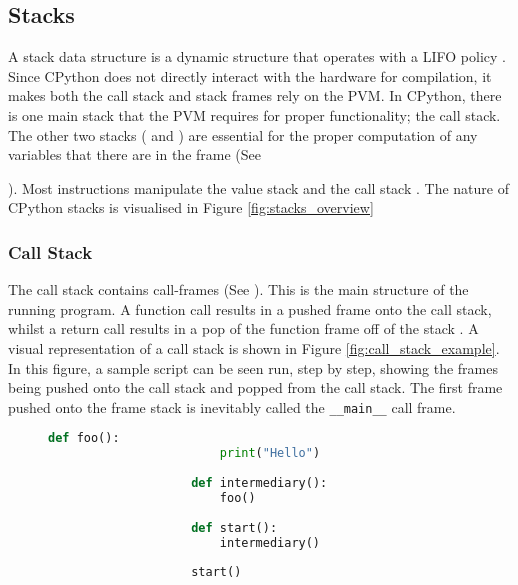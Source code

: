 		\subsection{Stacks}
		\label{subsec:stacks}
		\par A stack data structure is a dynamic structure that operates with a LIFO policy \cite[]{intro2009algorithms}. Since CPython does not directly interact with
		the hardware for compilation, it makes both the call stack and stack frames rely on the PVM. In CPython, there is one main stack that the PVM requires for proper functionality; the call stack. 
		The other two stacks ( and ) are essential for the proper computation of any variables that there are in the
		frame (See {{\bfseries{}}). Most instructions manipulate the value stack and the call stack \cite[]{general2018stacks}. The nature of CPython stacks is visualised in Figure \ref{fig:stacks_overview}
			\subsubsection*{Call Stack}
			\label{subsubsec:call_stack}
			\par The call stack contains call-frames (See {\bfseries{}}). This is the main structure of the running program.
			A function call results in a pushed frame onto the call stack, whilst 
			a return call results in a pop of the function frame off of the stack \cite[]{call2010stack}. A visual representation of a call stack is shown in Figure \ref{fig:call_stack_example}. 
			In this figure, a sample script can be seen run, step by step, showing the frames being pushed onto the call stack and popped from the call stack.
			The first frame pushed onto the frame stack is inevitably called the \lstinline|__main__| call frame.

			\begin{figure}
				\centering
				\label{lst:callstackexample}
				\begin{lstlisting}[language=Python,caption=Python script]
					def foo():
						print("Hello")
					
					def intermediary():
						foo()
						
					def start():
						intermediary()
					
					start()
				\end{lstlisting}
				

\end{figure}}
